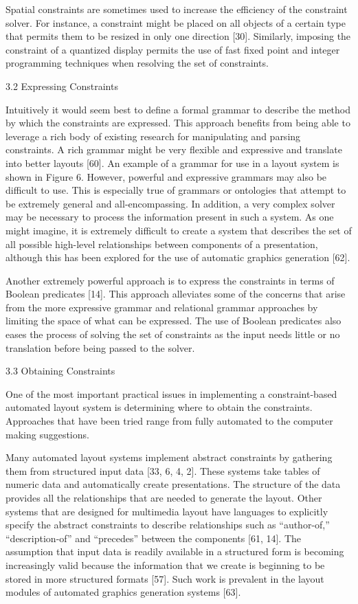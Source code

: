     Spatial constraints are sometimes used to increase the efficiency of the constraint solver. For instance, a constraint might be placed on all objects of a certain type that permits them to be resized in only one direction [30]. Similarly, imposing the constraint of a quantized display permits the use of fast fixed point and integer programming techniques when resolving the set of constraints.

    3.2 Expressing Constraints

    Intuitively it would seem best to define a formal grammar to describe the method by which the constraints are expressed. This approach benefits from being able to leverage a rich body of existing research for manipulating and parsing constraints. A rich grammar might be very flexible and expressive and translate into better layouts [60]. An example of a grammar for use in a layout system is shown in Figure 6. However, powerful and expressive grammars may also be difficult to use. This is especially true of grammars or ontologies that attempt to be extremely general and all-encompassing. In addition, a very complex solver may be necessary to process the information present in such a system. As one might imagine, it is extremely difficult to create a system that describes the set of all possible high-level relationships between components of a presentation, although this has been explored for the use of automatic graphics generation [62].

    Another extremely powerful approach is to express the constraints in terms of Boolean predicates [14]. This approach alleviates some of the concerns that arise from the more expressive grammar and relational grammar approaches by limiting the space of what can be expressed. The use of Boolean predicates also eases the process of solving the set of constraints as the input needs little or no translation before being passed to the solver.

    3.3 Obtaining Constraints

    One of the most important practical issues in implementing a constraint-based automated layout system is determining where to obtain the constraints. Approaches that have been tried range from fully automated to the computer making suggestions.

    Many automated layout systems implement abstract constraints by gathering them from structured input data [33, 6, 4, 2]. These systems take tables of numeric data and automatically create presentations. The structure of the data provides all the relationships that are needed to generate the layout. Other systems that are designed for multimedia layout have languages to explicitly specify the abstract constraints to describe relationships such as “author-of,” “description-of” and “precedes” between the components [61, 14]. The assumption that input data is readily available in a structured form is becoming increasingly valid because the information that we create is beginning to be stored in more structured formats [57]. Such work is prevalent in the layout modules of automated graphics generation systems [63].

